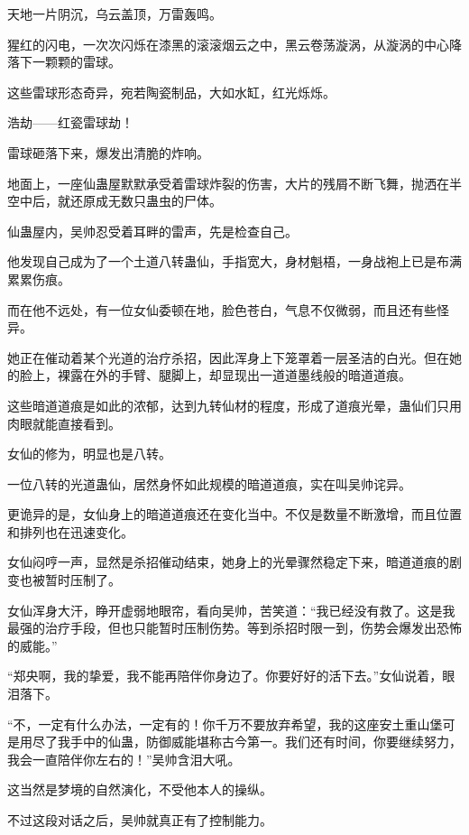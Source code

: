 
\begin{this_body}



天地一片阴沉，乌云盖顶，万雷轰鸣。

猩红的闪电，一次次闪烁在漆黑的滚滚烟云之中，黑云卷荡漩涡，从漩涡的中心降落下一颗颗的雷球。

这些雷球形态奇异，宛若陶瓷制品，大如水缸，红光烁烁。

浩劫——红瓷雷球劫！

雷球砸落下来，爆发出清脆的炸响。

地面上，一座仙蛊屋默默承受着雷球炸裂的伤害，大片的残屑不断飞舞，抛洒在半空中后，就还原成无数只蛊虫的尸体。

仙蛊屋内，吴帅忍受着耳畔的雷声，先是检查自己。

他发现自己成为了一个土道八转蛊仙，手指宽大，身材魁梧，一身战袍上已是布满累累伤痕。

而在他不远处，有一位女仙委顿在地，脸色苍白，气息不仅微弱，而且还有些怪异。

她正在催动着某个光道的治疗杀招，因此浑身上下笼罩着一层圣洁的白光。但在她的脸上，裸露在外的手臂、腿脚上，却显现出一道道墨线般的暗道道痕。

这些暗道道痕是如此的浓郁，达到九转仙材的程度，形成了道痕光晕，蛊仙们只用肉眼就能直接看到。

女仙的修为，明显也是八转。

一位八转的光道蛊仙，居然身怀如此规模的暗道道痕，实在叫吴帅诧异。

更诡异的是，女仙身上的暗道道痕还在变化当中。不仅是数量不断激增，而且位置和排列也在迅速变化。

女仙闷哼一声，显然是杀招催动结束，她身上的光晕骤然稳定下来，暗道道痕的剧变也被暂时压制了。

女仙浑身大汗，睁开虚弱地眼帘，看向吴帅，苦笑道：“我已经没有救了。这是我最强的治疗手段，但也只能暂时压制伤势。等到杀招时限一到，伤势会爆发出恐怖的威能。”

“郑央啊，我的挚爱，我不能再陪伴你身边了。你要好好的活下去。”女仙说着，眼泪落下。

“不，一定有什么办法，一定有的！你千万不要放弃希望，我的这座安土重山堡可是用尽了我手中的仙蛊，防御威能堪称古今第一。我们还有时间，你要继续努力，我会一直陪伴你左右的！”吴帅含泪大吼。

这当然是梦境的自然演化，不受他本人的操纵。

不过这段对话之后，吴帅就真正有了控制能力。


\end{this_body}
